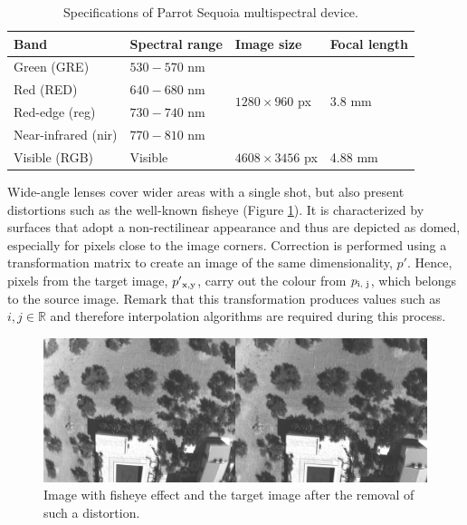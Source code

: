\renewcommand{\arraystretch}{1.2}
\begin{table}[ht]
    \small
    \caption{Specifications of Parrot Sequoia multispectral device.}
    \label{table:parrot_sequoia}
    \begin{tabular}{llll}
        \toprule
        Band & Spectral range & Image size & Focal length\\
        \midrule
        Green (GRE) & $530-570$ \si{\nano\meter} & \multirow{4}{*}{$1280 \times 960$ px} & \multirow{4}{*}{3.8 \si{\milli\meter}}\\
        Red (RED) & $640-680$ \si{\nano\meter} & & \\
        Red-edge (\acrshort{reg}) & $730-740$ \si{\nano\meter} & & \\
        Near-infrared (\acrshort{nir}) & $770-810$ \si{\nano\meter} & &\\
        \cmidrule{1-4}
        Visible (RGB) & Visible & $4608 \times 3456$ px & 4.88 \si{\milli\meter}\\
        \bottomrule
    \end{tabular}
\end{table}
\renewcommand{\arraystretch}{1}

Wide-angle lenses cover wider areas with a single shot, but also present distortions such as the well-known fisheye (Figure \ref{fig:fisheye_sample}). It is characterized by surfaces that adopt a non-rectilinear appearance and thus are depicted as domed, especially for pixels close to the image corners. Correction is performed using a transformation matrix to create an image of the same dimensionality, $p'$. Hence, pixels from the target image, $p'\textsubscript{x,y}$, carry out the colour from $p\textsubscript{i, j}$, which belongs to the source image. Remark that this transformation produces values such as $i, j \in \mathbb{R}$ and therefore interpolation algorithms are required during this process.

\begin{figure}[ht]
	\includegraphics{figs/materials/fisheye_sample.png}
	\caption{Image with fisheye effect and the target image after the removal of such a distortion.}
	\label{fig:fisheye_sample}
\end{figure}

